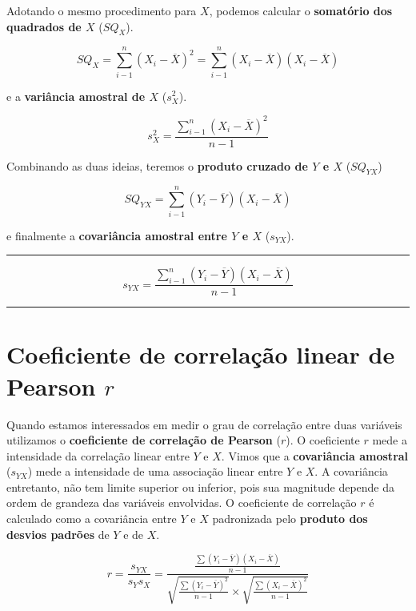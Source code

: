 \documentclass[
]{book}
\begin{document}
Adotando o mesmo procedimento para \(X\), podemos calcular o \textbf{somatório dos quadrados de \(X\)} (\(SQ_X\)).

\[SQ_X = \sum_{i-1}^{n} (X_i - \overline{X})^2 = \sum_{i-1}^{n}(X_i - \overline{X}) (X_i - \overline{X})\]

e a \textbf{variância amostral de \(X\)} (\(s^2_X\)).

\[s^2_X = \frac{\sum_{i-1}^{n} (X_i - \overline{X})^2}{n-1}\]

Combinando as duas ideias, teremos o \textbf{produto cruzado de \(Y\) e \(X\)} (\(SQ_{YX}\))

\[SQ_{YX} = \sum_{i-1}^{n}(Y_i - \overline{Y}) (X_i - \overline{X})\]

e finalmente a \textbf{covariância amostral entre \(Y\) e \(X\)} (\(s_{YX}\)).

\begin{center}\rule{0.5\linewidth}{0.5pt}\end{center}

\[s_{YX} = \frac{\sum_{i-1}^{n}(Y_i - \overline{Y}) (X_i - \overline{X})}{n-1}\]

\begin{center}\rule{0.5\linewidth}{0.5pt}\end{center}

\hypertarget{coeficiente-de-correlauxe7uxe3o-linear-de-pearson-r}{%
\section{\texorpdfstring{Coeficiente de correlação linear de Pearson \(r\)}{Coeficiente de correlação linear de Pearson r}}\label{coeficiente-de-correlauxe7uxe3o-linear-de-pearson-r}}

Quando estamos interessados em medir o grau de correlação entre duas variáveis utilizamos o \textbf{coeficiente de correlação de Pearson} (\textbf{\(r\)}). O coeficiente \(r\) mede a intensidade da correlação linear entre \(Y\) e \(X\). Vimos que a \textbf{covariância amostral} (\(s_{YX}\)) mede a intensidade de uma associação linear entre \(Y\) e \(X\). A covariância entretanto, não tem limite superior ou inferior, pois sua magnitude depende da ordem de grandeza das variáveis envolvidas. O coeficiente de correlação \(r\) é calculado como a covariância entre \(Y\) e \(X\) padronizada pelo \textbf{produto dos desvios padrões} de \(Y\) e de \(X\).

\[r = \frac{s_{YX}}{s_Y s_X} = 
\frac{\frac{\sum{(Y_i - \overline{Y})(X_i - \overline{X})}}{n-1}}
{\sqrt{\frac{\sum{(Y_i - \overline{Y})^2}}{n-1}}  \times 
\sqrt{\frac{\sum{(X_i - \overline{X})^2}}{n-1}}}\]
\end{document}
